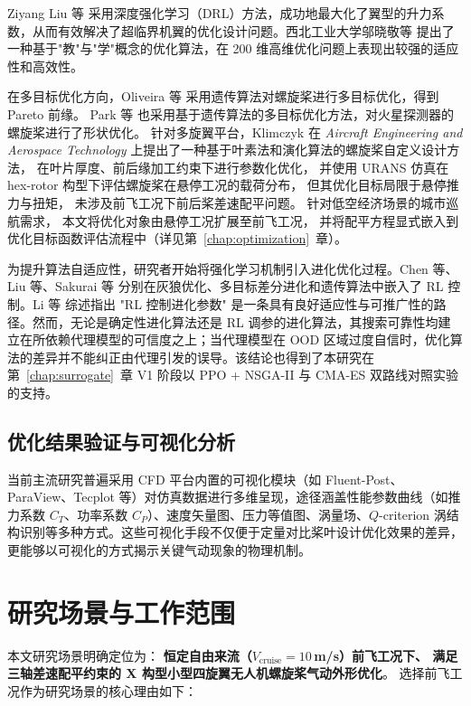 Ziyang Liu 等\cite{Liu2024} 采用深度强化学习（DRL）方法，成功地最大化了翼型的升力系数，从而有效解决了超临界机翼的优化设计问题。西北工业大学邬晓敬等\cite{Wu2022} 提出了一种基于"教"与"学"概念的优化算法，在 200 维高维优化问题上表现出较强的适应性和高效性。

在多目标优化方向，Oliveira 等\cite{Oliveira2023} 采用遗传算法对螺旋桨进行多目标优化，得到 Pareto 前缘。
Park 等\cite{Park2022} 也采用基于遗传算法的多目标优化方法，对火星探测器的螺旋桨进行了形状优化。
针对多旋翼平台，Klimczyk\cite{Klimczyk2022} 在 \emph{Aircraft Engineering and Aerospace Technology} 上提出了一种基于叶素法和演化算法的螺旋桨自定义设计方法，
在叶片厚度、前后缘加工约束下进行参数化优化，
并使用 URANS 仿真在 hex-rotor 构型下评估螺旋桨在悬停工况的载荷分布，
但其优化目标局限于悬停推力与扭矩，
未涉及前飞工况下前后桨差速配平问题。
针对低空经济场景的城市巡航需求，
本文将优化对象由悬停工况扩展至前飞工况，
并将配平方程显式嵌入到优化目标函数评估流程中（详见第~\ref{chap:optimization}~章）。

为提升算法自适应性，研究者开始将强化学习机制引入进化优化过程。Chen 等\cite{Chen2025rl}、Liu 等\cite{Liu2024rl}、Sakurai 等\cite{Sakurai2010rl} 分别在灰狼优化、多目标差分进化和遗传算法中嵌入了 RL 控制。Li 等\cite{Li2024review} 综述指出 "RL 控制进化参数" 是一条具有良好适应性与可推广性的路径。然而，无论是确定性进化算法还是 RL 调参的进化算法，其搜索可靠性均建立在所依赖代理模型的可信度之上；当代理模型在 OOD 区域过度自信时，优化算法的差异并不能纠正由代理引发的误导。该结论也得到了本研究在第~\ref{chap:surrogate}~章 V1 阶段以 PPO + NSGA-II 与 CMA-ES 双路线对照实验的支持。

\subsection{优化结果验证与可视化分析}

当前主流研究普遍采用 CFD 平台内置的可视化模块（如 Fluent-Post、ParaView、Tecplot 等）对仿真数据进行多维呈现，途径涵盖性能参数曲线（如推力系数 $C_T$、功率系数 $C_P$）、速度矢量图、压力等值图、涡量场、$Q$-criterion 涡结构识别等多种方式。这些可视化手段不仅便于定量对比桨叶设计优化效果的差异，更能够以可视化的方式揭示关键气动现象的物理机制。

\section{研究场景与工作范围}
\label{sec:scope}

本文研究场景明确定位为：
\textbf{恒定自由来流（$V_{\text{cruise}}=10$\,m/s）前飞工况下、
满足三轴差速配平约束的 X 构型小型四旋翼无人机螺旋桨气动外形优化}。
选择前飞工况作为研究场景的核心理由如下：

